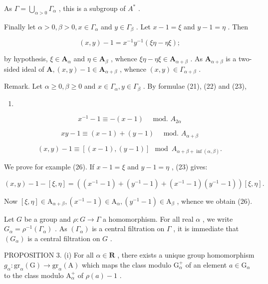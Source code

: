 As \(\Gamma = \bigcup_{\alpha > 0} \Gamma_{\alpha}\) , this is a subgroup of \(A^{*}\) .

Finally let \(\alpha > 0, \beta > 0, x \in \Gamma_{\alpha}\) and \(y \in \Gamma_{\beta}\) . Let \(x - 1 = \xi\) and \(y - 1 = \eta\) . Then

\[
(x, y) - 1 = x ^ {- 1} y ^ {- 1} (\xi \eta - \eta \xi);\tag{23}
\]

by hypothesis, \(\xi \in \mathbf{A}_{\alpha}\) and \(\eta \in \mathbf{A}_{\beta}\) , whence \(\xi \eta - \eta \xi \in \mathbf{A}_{\alpha + \beta}\) . As \(\mathbf{A}_{\alpha + \beta}\) is a two-sided ideal of \(\mathbf{A}, (x, y) - 1 \in \mathbf{A}_{\alpha + \beta}\) , whence \((x, y) \in \Gamma_{\alpha + \beta}\) .

Remark. Let \(\alpha \geqslant 0, \beta \geqslant 0\) and \(x \in \Gamma_{\alpha}, y \in \Gamma_{\beta}\) . By formulae (21), (22) and (23),

\begin{enumerate}
\def\labelenumi{(\arabic{enumi})}
\setcounter{enumi}{23}
\tightlist
\item
\end{enumerate}

\[
x ^ {- 1} - 1 \equiv - (x - 1) \quad \text { mod. } A _ {2 \alpha}\tag{24}
\]

\[
x y - 1 \equiv (x - 1) + (y - 1) \quad \text { mod. } A _ {\alpha + \beta}\tag{25}
\]

\[
(x, y) - 1 \equiv [ (x - 1), (y - 1) ] \mod A _ {\alpha + \beta + \inf (\alpha , \beta)}.\tag{26}
\]

We prove for example (26). If \(x - 1 = \xi\) and \(y - 1 = \eta\) , (23) gives:

\[
(x, y) - 1 - [ \xi , \eta ] = ((x ^ {- 1} - 1) + (y ^ {- 1} - 1) + (x ^ {- 1} - 1) (y ^ {- 1} - 1)) [ \xi , \eta ].
\]

Now \([\xi, \eta] \in \mathrm{A}_{\alpha + \beta}, (x^{-1} - 1) \in \mathrm{A}_{\alpha}, (y^{-1} - 1) \in \mathrm{A}_{\beta}\) , whence we obtain (26).

Let \(G\) be a group and \(\rho: G \to \Gamma\) a homomorphism. For all real \(\alpha\) , we write \(G_{\alpha} = \rho^{-1}(\Gamma_{\alpha})\) . As \((\Gamma_{\alpha})\) is a central filtration on \(\Gamma\) , it is immediate that \((G_{\alpha})\) is a central filtration on \(G\) .

PROPOSITION 3. (i) For all \(\alpha \in \mathbf{R}\) , there exists a unique group homomorphism \(g_{\alpha} \colon \mathrm{gr}_{\alpha}(\mathrm{G}) \to \mathrm{gr}_{\alpha}(\mathrm{A})\) which maps the class modulo \(\mathrm{G}_{\alpha}^{+}\) of an element \(a \in \mathrm{G}_{\alpha}\) to the class modulo \(\mathrm{A}_{\alpha}^{+}\) of \(\rho(a) - 1\) .

